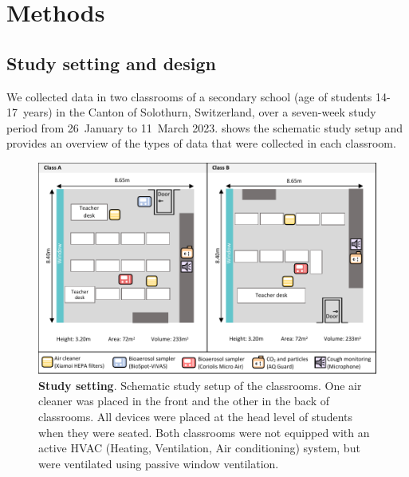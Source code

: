 \documentclass[fleqn,11pt]{wlscirep}
\begin{document}
\newpage

\section{Methods}

\subsection{Study setting and design} 

\noindent We collected data in two classrooms of a secondary school (age of students 14-17~years) in the Canton of Solothurn, Switzerland, over a seven-week study period from 26~January to 11~March 2023.  shows the schematic study setup and  provides an overview of the types of data that were collected in each classroom.

\begin{figure}[!htpb]
    \centering
    \includegraphics{../study_setting.pdf}
    \caption{\textbf{Study setting}. Schematic study setup of the classrooms. One air cleaner was placed in the front and the other in the back of classrooms. All devices were placed at the head level of students when they were seated. Both classrooms were not equipped with an active HVAC (Heating, Ventilation, Air conditioning) system, but were ventilated using passive window ventilation. }
    \label{fig:study-setup}
\end{figure}
\end{document}
